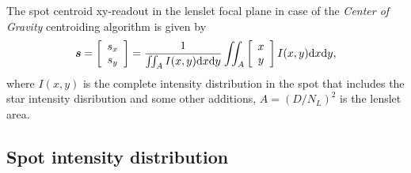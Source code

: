 The spot centroid xy-readout in the lenslet focal plane in case of the
\emph{Center of Gravity} centroiding algorithm  is given by
\begin{equation}
  \label{eq:10}
  \bm{s} = \left[ \begin{array}{c} s_{x} \\ s_{y} \end{array} \right] =
  \frac{1} {\iint_A I(x,y) {\rm d}x{\rm d}y}
  \iint_A
  \left[ \begin{array}{c} x \\ y \end{array} \right]
  I(x,y) {\rm d}x{\rm d}y,
\end{equation}
where $I(x,y)$ is the complete intensity distribution in the spot that
includes the star intensity disribution and some other additions,
$A=(D/N_L)^2$ is the lenslet area.

\subsection{Spot intensity distribution}
\label{sec:spot-intensity}

